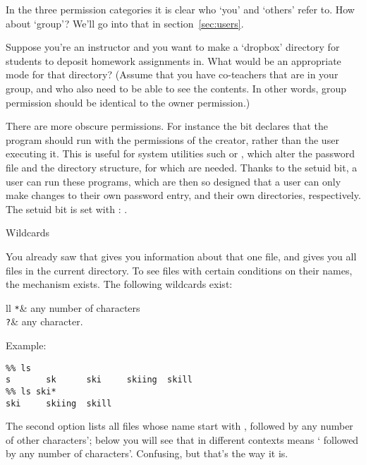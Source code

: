 In the three permission categories it is clear who `you' and `others'
refer to. How about `group'? We'll go into that in section~\ref{sec:users}.

\begin{exercise}
  Suppose you're an instructor and you want to make a `dropbox'
  directory for students to deposit homework assignments in.
  What would be an appropriate mode for that directory?
  (Assume that you have co-teachers that are in your group,
  and who also need to be able to see the contents. In other words,
  group permission should be identical to the owner permission.)
\end{exercise}


\begin{remark}
  There are more obscure permissions. For instance the
   bit declares that the program should run with the
  permissions of the creator, rather than the user executing it. This
  is useful for system utilities such  or , which
  alter the password file and the directory structure, for which
   are needed. Thanks to the setuid
  bit, a user can run these programs, which are then so designed that
  a user can only make changes to their own password entry, and their
  own directories, respectively. The setuid bit is set with
  : .
\end{remark}

 {Wildcards}
\label{sec:shell-wildcard}

You already saw that  gives you information about that
one file, and  gives you all files in the current directory. To
see files with certain conditions on their names, the
 mechanism exists. The following wildcards exist:

\begin{fntable}{ll}
  \verb+*+& any number of characters\\
  \verb+?+& any character.\\
\end{fntable}

Example:
\begin{verbatim}
%% ls
s       sk      ski     skiing  skill
%% ls ski*
ski     skiing  skill
\end{verbatim}
The second option lists all files whose name start with
, followed by any number of other characters'; below you will
see that in different contexts  means ` followed by any
number of  characters'. Confusing, but that's the way it is.

